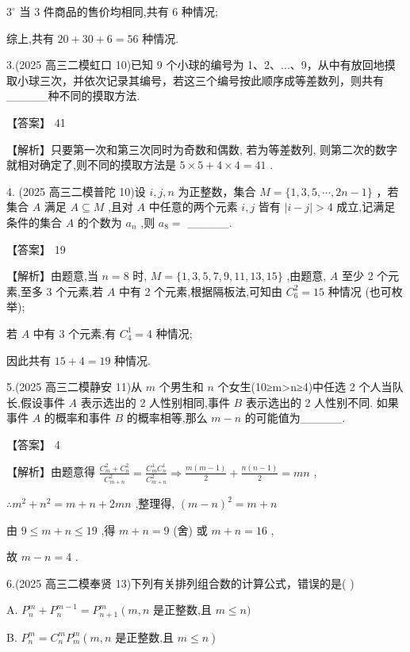 \documentclass[10pt]{article}
\begin{document}
\({3}^{ \circ  }\) 当 3 件商品的售价均相同,共有 6 种情况;

综上,共有 \({20} + {30} + 6 = {56}\) 种情况.

3.(2025 高三二模虹口 10)已知 9 个小球的编号为 1、2、...、9，从中有放回地摸取小球三次，并依次记录其编号，若这三个编号按此顺序成等差数列，则共有\_\_\_\_\_种不同的摸取方法.

【答案】 41

【解析】只要第一次和第三次同时为奇数和偶数, 若为等差数列, 则第二次的数字就相对确定了,则不同的摸取方法是 \(5 \times  5 + 4 \times  4 = {41}\) .

4. (2025 高三二模普陀 10)设 \(i,j,n\) 为正整数，集合 \(M = \{ 1,3,5,\cdots ,{2n} - 1\}\) ，若集合 \(A\) 满足 \(A \subseteq  M\) ,且对 \(A\) 中任意的两个元素 \(i,j\) 皆有 \(\left| {i - j}\right|  > 4\) 成立,记满足条件的集合 \(A\) 的个数为 \({a}_{n}\) ,则 \({a}_{8} =\) \_\_\_\_\_.

【答案】 19

【解析】由题意,当 \(n = 8\) 时, \(M = \{ 1,3,5,7,9,{11},{13},{15}\}\) ,由题意, \(A\) 至少 2 个元素,至多 3 个元素,若 \(A\) 中有 2 个元素,根据隔板法,可知由 \({C}_{6}^{2} = {15}\) 种情况 (也可枚举);

若 \(A\) 中有 3 个元素,有 \({C}_{4}^{1} = 4\) 种情况;

因此共有 \({15} + 4 = {19}\) 种情况.

5.(2025 高三二模静安 11)从 \(m\) 个男生和 \(n\) 个女生(10≥m>n≥4)中任选 2 个人当队长,假设事件 \(A\) 表示选出的 2 人性别相同,事件 \(B\) 表示选出的 2 人性别不同. 如果事件 \(A\) 的概率和事件 \(B\) 的概率相等,那么 \(m - n\) 的可能值为\_\_\_\_\_.

【答案】 4

【解析】由题意得 \(\frac{{C}_{m}^{2} + {C}_{n}^{2}}{{C}_{m + n}^{2}} = \frac{{C}_{m}^{1}{C}_{n}^{1}}{{C}_{m + n}^{2}} \Rightarrow  \frac{m\left( {m - 1}\right) }{2} + \frac{n\left( {n - 1}\right) }{2} = {mn}\) ,

\(\therefore {m}^{2} + {n}^{2} = m + n + {2mn}\) ,整理得, \({\left( m - n\right) }^{2} = m + n\)

由 \(9 \leq  m + n \leq  {19}\) ,得 \(m + n = 9\) (舍) 或 \(m + n = {16}\) ,

故 \(m - n = 4\) .

6.(2025 高三二模奉贤 13)下列有关排列组合数的计算公式，错误的是( )

A. \({P}_{n}^{m} + {P}_{n}^{m - 1} = {P}_{n + 1}^{m}\left( {m,n}\right.\) 是正整数,且 \(m \leq  n)\)

B. \({P}_{n}^{m} = {C}_{n}^{m}{P}_{m}^{m}\left( {m,n\text{ 是正整数,且 }m \leq  n}\right)\)
\end{document}
